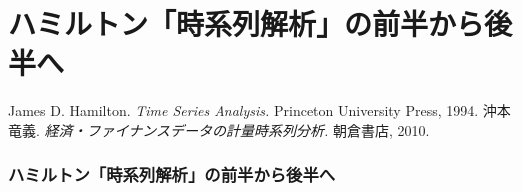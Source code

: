 \documentclass[b5paper,xelatex,ja=standard,10pt]{bxjsarticle}
\begin{document}


\part*{ハミルトン「時系列解析」の前半から後半へ}

\begin{spacing}{0.5}
\tableofcontents
\end{spacing}

\begin{thebibliography}{99}
     James D. Hamilton. \textit{Time Series Analysis.} Princeton University Press, 1994.
     沖本 竜義. \textit{経済・ファイナンスデータの計量時系列分析.} 朝倉書店, 2010.
\end{thebibliography}
\vspace{3pt}


\section*{ハミルトン「時系列解析」の前半から後半へ}
\vspace{3pt}
\end{document}
